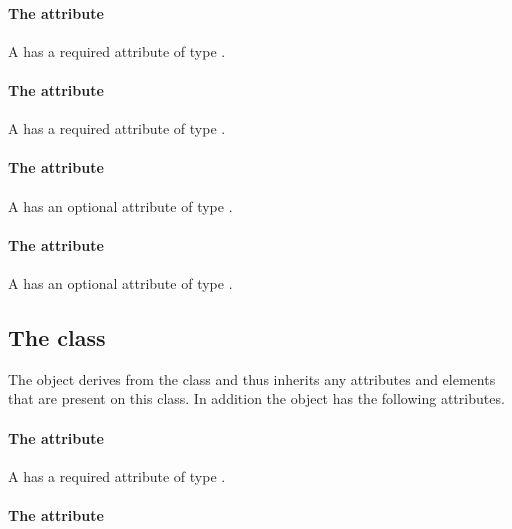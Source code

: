 \paragraph{The \fixttspace{} attribute}

A \RenderRectangle has a required attribute  of type
\RelAbsVector.

\paragraph{The \fixttspace{} attribute}

A \RenderRectangle has a required attribute  of type
\RelAbsVector.

\paragraph{The \fixttspace{} attribute}

A \RenderRectangle has an optional attribute  of type
\RelAbsVector.

\paragraph{The \fixttspace{} attribute}

A \RenderRectangle has an optional attribute  of type
\RelAbsVector.

\subsection{The  class}
\label{rendercubicbezier-class}


The \RenderCubicBezier object derives from the  class
and thus inherits any attributes and elements that are present on this
class.
In addition the \RenderCubicBezier object has the following attributes.

\paragraph{The \fixttspace{} attribute}

A \RenderCubicBezier has a required attribute  of
type \RelAbsVector.

\paragraph{The \fixttspace{} attribute}


